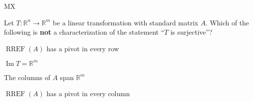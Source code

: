 \documentclass{article}
\newcommand{\IR}{\mathbb{R}}
\renewcommand{\Im}{\operatorname{Im}}
\newcommand{\RREF}{\operatorname{RREF}}
\begin{document}
\begin{module}{MX}{}
\begin{readinessAssuranceTest}
\item Let $T: \IR^n \rightarrow \IR^m$ be a linear transformation with standard matrix $A$.  Which of the following is {\bf not} a characterization of the statement ``$T$ is surjective''?
\begin{readinessAssuranceTestChoices}
\item $\RREF(A)$ has a pivot in every row
\item $\Im T = \IR^m$
\item The columns of $A$ span $\IR^m$
\item $\RREF(A)$ has a pivot in every column %
\end{readinessAssuranceTestChoices}





\end{readinessAssuranceTest}
\end{module}
\end{document}
